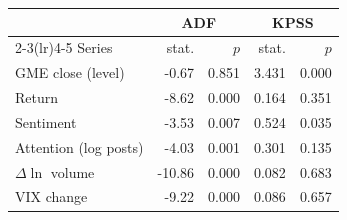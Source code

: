 \begin{tabular}{lrrrr}
\toprule
 & \multicolumn{2}{c}{ADF} & \multicolumn{2}{c}{KPSS} \\
\cmidrule(lr){2-3}\cmidrule(lr){4-5}
Series & stat. & $p$ & stat. & $p$ \\
\midrule
GME close (level) & -0.67 & 0.851 & 3.431 & 0.000 \\
Return & -8.62 & 0.000 & 0.164 & 0.351 \\
Sentiment & -3.53 & 0.007 & 0.524 & 0.035 \\
Attention (log posts) & -4.03 & 0.001 & 0.301 & 0.135 \\
$\Delta\ln$ volume & -10.86 & 0.000 & 0.082 & 0.683 \\
VIX change & -9.22 & 0.000 & 0.086 & 0.657 \\
\bottomrule
\end{tabular}
